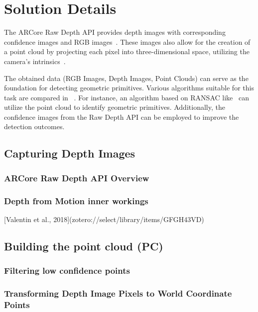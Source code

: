 \chapter{Solution Details}

The ARCore Raw Depth API provides depth images with corresponding confidence images and RGB images~\parencite{google_llc_arcore_doc}.
These images also allow for the creation of a point cloud by projecting each pixel into three-dimensional space, utilizing the camera's intrinsics~\parencite{google_llc_codelab_raw_depth}.

The obtained data (RGB Images, Depth Images, Point Clouds) can serve as the foundation for detecting geometric primitives.
Various algorithms suitable for this task are compared in ~\parencite{kaiser_survey_2019}.
For instance, an algorithm based on RANSAC like~\parencite{schnabel_efficient_2007}
can utilize the point cloud to identify geometric primitives.
Additionally, the confidence images from the Raw Depth API can be employed to improve the detection outcomes.


\section{Capturing Depth Images}

\subsection{ARCore Raw Depth API Overview}

\subsection{Depth from Motion inner workings}
[Valentin et al., 2018](zotero://select/library/items/GFGH43VD)


\section{Building the point cloud (PC)}

\subsection{Filtering low confidence points}

\subsection{Transforming Depth Image Pixels to World Coordinate Points}

